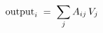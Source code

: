 \documentclass[preview]{standalone}
\begin{document}
\begin{align*}
\special{dvisvgm:raw <g id='unique000'>}\text{output}_i \;=\; \sum_{j} A_{ij}\,V_{j}\special{dvisvgm:raw </g>}
\end{align*}
\end{document}
